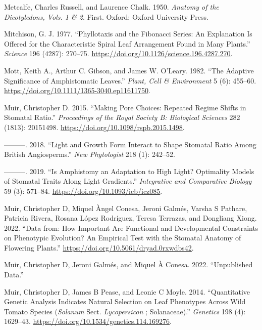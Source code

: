 \documentclass[
  12pt,
]{article}
\newlength{\cslhangindent}
\newlength{\cslentryspacingunit} %
\newenvironment{CSLReferences}[2] %
 {%
  \setlength{\parindent}{0pt}
  \ifodd #1
  \let\oldpar\par
  \def\par{\hangindent=\cslhangindent\oldpar}
  \fi
  \setlength{\parskip}{#2\cslentryspacingunit}
 }%
 {}
\begin{document}
\begin{CSLReferences}{1}{0}
\leavevmode{}%
Metcalfe, Charles Russell, and Laurence Chalk. 1950. \emph{Anatomy of the Dicotyledons, {Vols}. 1 \& 2}. First. Oxford: Oxford University Press.

\leavevmode{}%
Mitchison, G. J. 1977. {``Phyllotaxis and the {Fibonacci} {Series}: {An} Explanation Is Offered for the Characteristic Spiral Leaf Arrangement Found in Many Plants.''} \emph{Science} 196 (4287): 270--75. \url{https://doi.org/10.1126/science.196.4287.270}.

\leavevmode{}%
Mott, Keith A., Arthur C. Gibson, and James W. O'Leary. 1982. {``The Adaptive Significance of Amphistomatic Leaves.''} \emph{Plant, Cell \& Environment} 5 (6): 455--60. \url{https://doi.org/10.1111/1365-3040.ep11611750}.

\leavevmode{}%
Muir, Christopher D. 2015. {``Making Pore Choices: Repeated Regime Shifts in Stomatal Ratio.''} \emph{Proceedings of the Royal Society B: Biological Sciences} 282 (1813): 20151498. \url{https://doi.org/10.1098/rspb.2015.1498}.

\leavevmode{}%
---------. 2018. {``Light and Growth Form Interact to Shape Stomatal Ratio Among {British} Angiosperms.''} \emph{New Phytologist} 218 (1): 242--52.

\leavevmode{}%
---------. 2019. {``Is {Amphistomy} an {Adaptation} to {High} {Light}? {Optimality} {Models} of {Stomatal} {Traits} Along {Light} {Gradients}.''} \emph{Integrative and Comparative Biology} 59 (3): 571--84. \url{https://doi.org/10.1093/icb/icz085}.

\leavevmode{}%
Muir, Christopher D, Miquel Àngel Conesa, Jeroni Galmés, Varsha S Pathare, Patricia Rivera, Rosana López Rodríguez, Teresa Terrazas, and Dongliang Xiong. 2022. {``Data from: {How} Important Are Functional and Developmental Constraints on Phenotypic Evolution? {An} Empirical Test with the Stomatal Anatomy of Flowering Plants.''} \url{https://doi.org/10.5061/dryad.0rxwdbs42}.

\leavevmode{}%
Muir, Christopher D, Jeroni Galmés, and Miquel À Conesa. 2022. {``Unpublished Data.''}

\leavevmode{}%
Muir, Christopher D, James B Pease, and Leonie C Moyle. 2014. {``Quantitative {Genetic} {Analysis} {Indicates} {Natural} {Selection} on {Leaf} {Phenotypes} {Across} {Wild} {Tomato} {Species} (\emph{Solanum} Sect. \emph{Lycopersicon} ; {Solanaceae}).''} \emph{Genetics} 198 (4): 1629--43. \url{https://doi.org/10.1534/genetics.114.169276}.


\end{CSLReferences}
\end{document}
